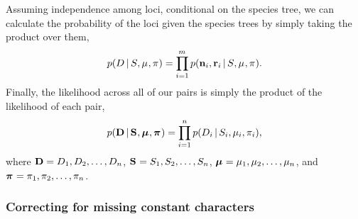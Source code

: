 \begin{linenomath}
Assuming independence among loci, conditional on the species tree, we can
calculate the probability of the \nloci{} loci given the species trees by
simply taking the product over them,
\begin{equation}
    \pr(\comparisondata \given \sptree, \murate, \gfreq)
    =
    \prod_{i=1}^{\nloci}
    \pr(\leafallelecounts[i], \leafredallelecounts[i] \given \sptree, \murate, \gfreq).
    \label{eq:comparisonlikelihood}
\end{equation}
Finally, the likelihood across all of our pairs is simply the product of the
likelihood of each pair,
\begin{equation}
    \pr(
    \alldata
    \given
    \sptrees,
    \murates,
    \gfreqs)
    =
    \prod_{i=1}^{\ncomparisons}
    \pr(\comparisondata[i] \given \sptree[i], \murate[i], \gfreq[i]),
    \label{eq:collectionlikelihood}
\end{equation}
where
$\alldata = \comparisondata[1], \comparisondata[2], \ldots, \comparisondata[\ncomparisons]$,
$\sptrees = \sptree[1], \sptree[2], \ldots, \sptree[\ncomparisons]$,
$\murates = \murate[1], \murate[2], \ldots, \murate[\ncomparisons]$,
and
$\gfreqs = \gfreq[1], \gfreq[2], \ldots, \gfreq[\ncomparisons]$.
\end{linenomath}

\subsubsection{Correcting for missing constant characters}

